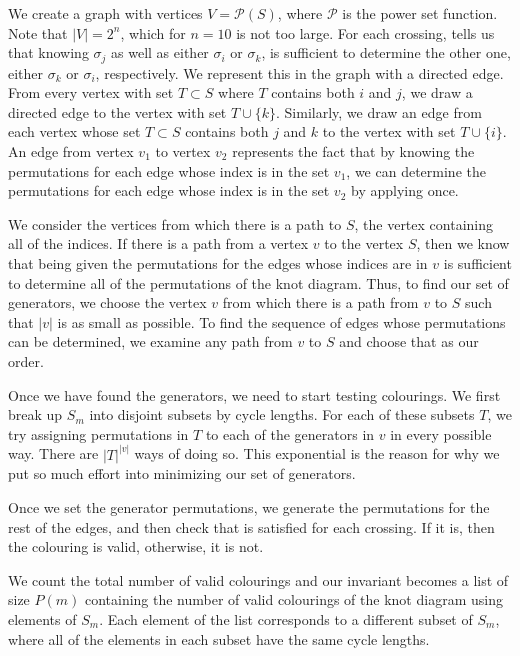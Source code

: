 \begin{paper}
We create a graph with vertices $V=\mathcal{P}(S)$, where $\mathcal{P}$ is the
power set function.
Note that $|V|=2^n$, which for $n=10$ is not too large.
For each crossing, \eqRight tells us that knowing $\sigma_j$ as well as either
$\sigma_i$ or $\sigma_k$, is sufficient to determine the other one, either
$\sigma_k$ or $\sigma_i$, respectively.
We represent this in the graph with a directed edge.
From every vertex with set $T\subset S$ where $T$ contains both $i$ and $j$, we
draw a directed edge to the vertex with set $T\cup\{k\}$.
Similarly, we draw an edge from each vertex whose set $T\subset S$ contains both
$j$ and $k$ to the vertex with set $T\cup\{i\}$.
An edge from vertex $v_1$ to vertex $v_2$ represents the fact that by knowing
the permutations for each edge whose index is in the set $v_1$, we can determine
the permutations for each edge whose index is in the set $v_2$ by applying
\eqRight once.

We consider the vertices from which there is a path to $S$, the vertex
containing all of the indices.
If there is a path from a vertex $v$ to the vertex $S$, then we know that being
given the permutations for the edges whose indices are in $v$ is sufficient to
determine all of the permutations of the knot diagram.
Thus, to find our set of generators, we choose the vertex $v$ from which there
is a path from $v$ to $S$ such that $|v|$ is as small as possible.
To find the sequence of edges whose permutations can be determined, we examine
any path from $v$ to $S$ and choose that as our order.


Once we have found the generators, we need to start testing colourings.
We first break up $S_m$ into disjoint subsets by cycle lengths.
For each of these subsets $T$, we try assigning permutations in $T$ to each of
the generators in $v$ in every possible way.
There are $|T|^{|v|}$ ways of doing so.
This exponential is the reason for why we put so much effort into minimizing our
set of generators.

Once we set the generator permutations, we generate the permutations for the
rest of the edges, and then check that \eqRight is satisfied for each crossing.
If it is, then the colouring is valid, otherwise, it is not.


We count the total number of valid colourings and our invariant becomes a list
of size $P(m)$ containing the number of valid colourings of the knot diagram
using elements of $S_m$.
Each element of the list corresponds to a different subset of $S_m$, where all
of the elements in each subset have the same cycle lengths.


\end{paper}
